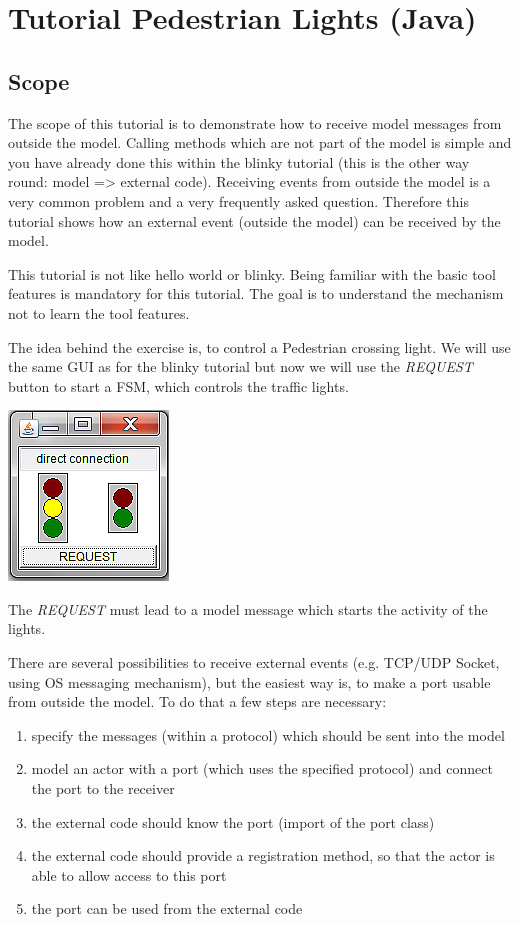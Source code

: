 \chapter{Tutorial Pedestrian Lights (Java)}

\section{Scope}

The scope of this tutorial is to demonstrate how to receive model messages from outside the model. Calling methods which are not part of the model is simple and you have already done this within the blinky tutorial (this is the other way round: model => external code). Receiving events from outside the model is a very common problem and a very frequently asked question. Therefore this tutorial shows how an external event (outside the model) can be received by the model.

This tutorial is not like hello world or blinky. Being familiar with the basic tool features is mandatory for this tutorial. The goal is to understand the mechanism not to learn the tool features.

The idea behind the exercise is, to control a Pedestrian crossing light. We will use the same GUI as for the blinky tutorial but now we will use the \textit{REQUEST} button to start a FSM, which controls the traffic lights.

\includegraphics{images/020-Blinky08.png}

The \textit{REQUEST} must lead to a model message which starts the activity of the lights.

There are several possibilities to receive external events (e.g. TCP/UDP Socket, using OS messaging mechanism), but the easiest way is, to make a port usable from outside the model. To do that a few steps are necessary:
\begin{enumerate}
\item specify the messages (within a protocol) which should be sent into the model
\item model an actor with a port (which uses the specified protocol) and connect the port to the receiver 
\item the external code should know the port (import of the port class)
\item the external code should provide a registration method, so that the actor is able to allow access to this port
\item the port can be used from the external code
\end{enumerate}

